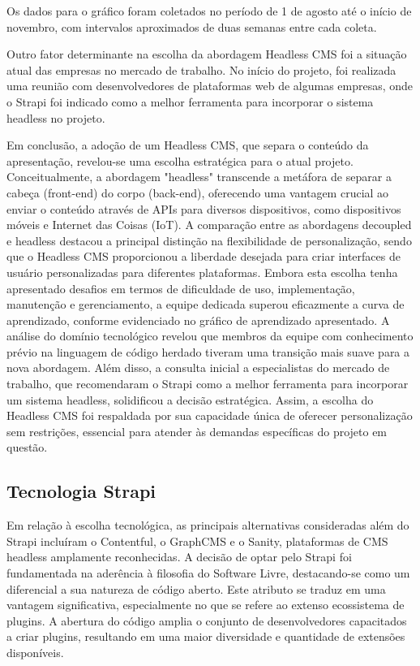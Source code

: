 Os dados para o gráfico foram coletados no período de 1 de agosto até o início de novembro, com intervalos aproximados de duas semanas entre cada coleta.

Outro fator determinante na escolha da abordagem Headless CMS foi a situação atual das empresas no mercado de trabalho. No início do projeto, foi realizada uma reunião com desenvolvedores de plataformas web de algumas empresas, onde o Strapi foi indicado como a melhor ferramenta para incorporar o sistema headless no projeto.

    Em conclusão, a adoção de um Headless CMS, que separa o conteúdo da apresentação, revelou-se uma escolha estratégica para o atual projeto. Conceitualmente, a abordagem "headless" transcende a metáfora de separar a cabeça (front-end) do corpo (back-end), oferecendo uma vantagem crucial ao enviar o conteúdo através de APIs para diversos dispositivos, como dispositivos móveis e Internet das Coisas (IoT). A comparação entre as abordagens decoupled e headless destacou a principal distinção na flexibilidade de personalização, sendo que o Headless CMS proporcionou a liberdade desejada para criar interfaces de usuário personalizadas para diferentes plataformas. Embora esta escolha tenha apresentado desafios em termos de dificuldade de uso, implementação, manutenção e gerenciamento, a equipe dedicada superou eficazmente a curva de aprendizado, conforme evidenciado no gráfico de aprendizado apresentado. A análise do domínio tecnológico revelou que membros da equipe com conhecimento prévio na linguagem de código herdado tiveram uma transição mais suave para a nova abordagem. Além disso, a consulta inicial a especialistas do mercado de trabalho, que recomendaram o Strapi como a melhor ferramenta para incorporar um sistema headless, solidificou a decisão estratégica. Assim, a escolha do Headless CMS foi respaldada por sua capacidade única de oferecer personalização sem restrições, essencial para atender às demandas específicas do projeto em questão.

    \subsection{Tecnologia Strapi}

   Em relação à escolha tecnológica, as principais alternativas consideradas além do Strapi incluíram o Contentful, o GraphCMS e o Sanity, plataformas de CMS headless amplamente reconhecidas. A decisão de optar pelo Strapi foi fundamentada na aderência à filosofia do Software Livre, destacando-se como um diferencial a sua natureza de código aberto. Este atributo se traduz em uma vantagem significativa, especialmente no que se refere ao extenso ecossistema de plugins. A abertura do código amplia o conjunto de desenvolvedores capacitados a criar plugins, resultando em uma maior diversidade e quantidade de extensões disponíveis.

